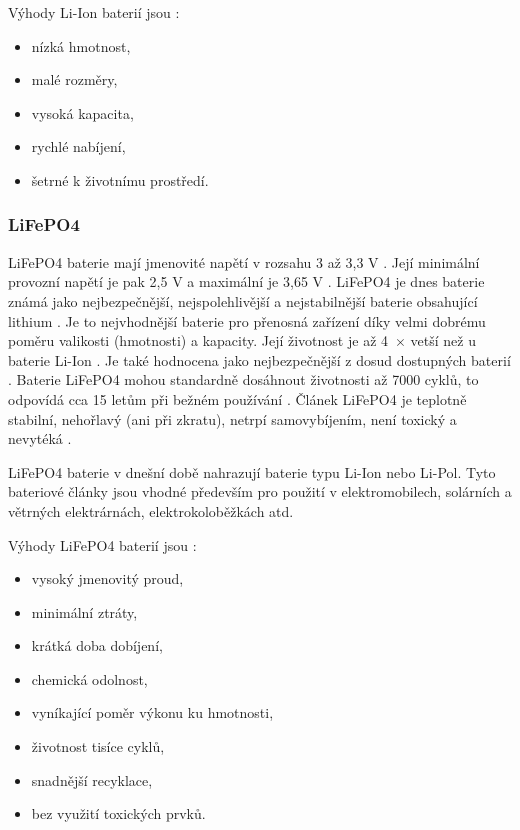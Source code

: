 Výhody Li-Ion baterií jsou \cite{Li-Ion}:
\begin{itemize}
  \item nízká hmotnost,
  \item malé rozměry,
  \item vysoká kapacita,
  \item rychlé nabíjení,
  \item šetrné k životnímu prostředí. 
\end{itemize}

\subsubsection{LiFePO4}
LiFePO4 baterie mají jmenovité napětí v rozsahu 3 až 3,3 V \cite{LiFePO4_malina}. Její minimální provozní napětí je pak 2,5 V a maximální je 3,65 V \cite{LiFePO4_malina}.
LiFePO4 je dnes baterie známá jako nejbezpečnější, nejspolehlivější a nejstabilnější baterie obsahující lithium \cite{LiFePO4_malina}. Je to nejvhodnější baterie pro 
přenosná zařízení díky velmi dobrému poměru valikosti (hmotnosti) a kapacity. Její životnost je až 4~$\times$ vetší než u baterie Li-Ion \cite{LiFePO4_malina}. Je také hodnocena
jako nejbezpečnější z dosud dostupných baterií \cite{LiFePO4_malina}. Baterie LiFePO4 mohou standardně dosáhnout životnosti až 7000 cyklů, to odpovídá cca 15 letům při bežném
používání \cite{LiFePO4_malina}. Článek LiFePO4 je teplotně stabilní, nehořlavý (ani při zkratu), netrpí samovybíjením, není toxický a nevytéká \cite{LiFePO4_malina}.

LiFePO4 baterie v dnešní době nahrazují baterie typu Li-Ion nebo Li-Pol.
Tyto bateriové články jsou vhodné především pro použití v elektromobilech, solárních a větrných elektrárnách, elektrokoloběžkách atd. 

Výhody LiFePO4 baterií jsou \cite{LiFePO4_smart}:
\begin{itemize}
  \item vysoký jmenovitý proud,
  \item minimální ztráty,
  \item krátká doba dobíjení,
  \item chemická odolnost,
  \item vyníkající poměr výkonu ku hmotnosti,
  \item životnost tisíce cyklů,
  \item snadnější recyklace,
  \item bez využití toxických prvků.
\end{itemize}


